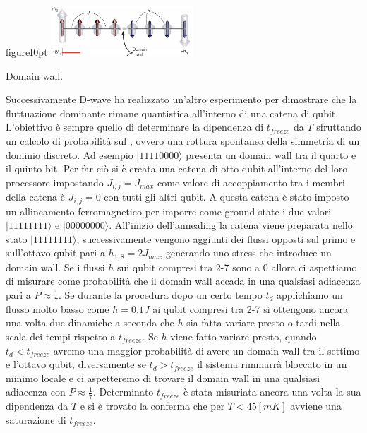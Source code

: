 \begin{wrapfloat}{figure}{I}{0pt}
\includegraphics[width=0.4\textwidth]{Immagini/wall.jpg}
\caption{Domain wall.}
\label{figura:wall}
\end{wrapfloat}
Successivamente D-wave ha realizzato un'altro esperimento per dimostrare che la fluttuazione dominante rimane quantistica all'interno di una catena di qubit. L'obiettivo è sempre quello di determinare la dipendenza di $t_{freeze}$ da $T$ sfruttando un calcolo di probabilità sul , ovvero una rottura spontanea della simmetria di un dominio discreto. Ad esempio $|11110000\rangle$ presenta un domain wall tra il quarto e il quinto bit.
Per far ciò si è creata una catena di otto qubit all'interno del loro processore impostando $J_{i,j} = J_{max}$ come valore di accoppiamento tra i membri della catena è $J_{i,j} = 0$ con tutti gli altri qubit. A questa catena è stato imposto un allineamento ferromagnetico per imporre come ground state i due valori $|11111111\rangle$ e $|00000000\rangle$. All'inizio dell'annealing la catena viene preparata nello stato $|11111111\rangle$, successivamente vengono aggiunti dei flussi opposti sul primo e sull'ottavo qubit pari a $h_{1,8} = 2J_{max}$ generando uno stress che introduce un domain wall. Se i flussi $h$ sui qubit compresi tra 2-7 sono a $0$ allora ci aspettiamo di misurare come probabilità che il domain wall accada in una qualsiasi adiacenza pari a $P \approx \frac{1}{7}$. Se durante la procedura dopo un certo tempo $t_d$ applichiamo un flusso molto basso come $h = 0.1J$ ai qubit compresi tra 2-7 si ottengono ancora una volta due dinamiche a seconda che $h$ sia fatta variare presto o tardi nella scala dei tempi rispetto a $t_{freeze}$.
Se $h$ viene fatto variare presto, quando $t_d < t_{freeze}$ avremo una maggior probabilità di avere un domain wall tra il settimo e l'ottavo qubit, diversamente se $t_d > t_{freeze}$ il sistema rimmarrà bloccato in un minimo locale e ci aspetteremo di trovare il domain wall in una qualsiasi adiacenza con $P \approx \frac{1}{7}$.
Determinato $t_{freeze}$ è stata misuriata ancora una volta la sua dipendenza da $T$ e si è trovato la conferma che per $T < 45 [mK]$ avviene una saturazione di $t_{freeze}$.
